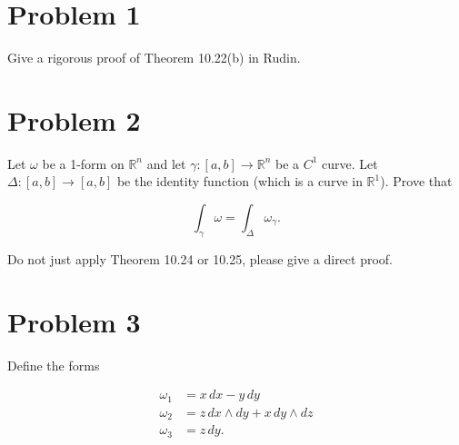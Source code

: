 \documentclass[11pt]{article}
\begin{document}
	
	
	\psetheader
    
    
    \section*{Problem 1}

Give a rigorous proof of Theorem 10.22(b) in Rudin.

\newpage

\section*{Problem 2}

Let $\omega$ be a 1-form on $\mathbb{R}^n$ and let $\gamma : [a, b] \to \mathbb{R}^n$ be a $C^1$ curve. Let $\Delta : [a, b] \to [a, b]$ be the identity function (which is a curve in $\mathbb{R}^1$). Prove that

\[
\int_{\gamma} \omega = \int_{\Delta} \omega_{\gamma}.
\]

Do not just apply Theorem 10.24 or 10.25, please give a direct proof.

\newpage

\section*{Problem 3}

Define the forms

\begin{align*}
\omega_1 &= x \, dx - y \, dy \\
\omega_2 &= z \, dx \wedge dy + x \, dy \wedge dz \\
\omega_3 &= z \, dy.
\end{align*}
\end{document}
